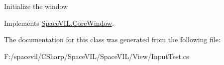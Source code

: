 Initialize the window 



Implements \mbox{\hyperlink{class_space_v_i_l_1_1_core_window_aa3cf4ac54d9651b1149584dc81042824}{Space\+V\+I\+L.\+Core\+Window}}.



The documentation for this class was generated from the following file\+:\begin{DoxyCompactItemize}
\item 
F\+:/spacevil/\+C\+Sharp/\+Space\+V\+I\+L/\+Space\+V\+I\+L/\+View/Input\+Test.\+cs\end{DoxyCompactItemize}
